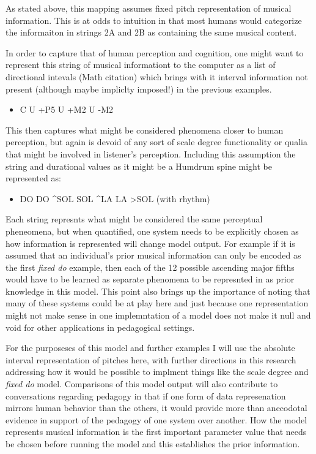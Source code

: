 \documentclass[]{book}
\providecommand{\tightlist}{%
  \setlength{\itemsep}{0pt}\setlength{\parskip}{0pt}}
\theoremstyle{definition}
\theoremstyle{definition}
\theoremstyle{definition}
\theoremstyle{remark}
\begin{document}
As stated above, this mapping assumes fixed pitch representation of
musical information. This is at odds to intuition in that most humans
would categorize the informaiton in strings 2A and 2B as containing the
same musical content.

In order to capture that of human perception and cognition, one might
want to represent this string of musical informationt to the computer as
a list of directional intevals (Math citation) which brings with it
interval information not present (although maybe impliclty imposed!) in
the previous examples.

\begin{itemize}
\tightlist
\item
  C U +P5 U +M2 U -M2
\end{itemize}

This then captures what might be considered phenomena closer to human
perception, but again is devoid of any sort of scale degree
functionality or qualia that might be involved in listener's perception.
Including this assumption the string and durational values as it might
be a Humdrum spine might be represented as:

\begin{itemize}
\tightlist
\item
  DO DO \^{}SOL SOL \^{}LA LA \textgreater{}SOL (with rhythm)
\end{itemize}

Each string represnts what might be considered the same perceptual
pheneomena, but when quantified, one system needs to be explicitly
chosen as how information is represented will change model output. For
example if it is assumed that an individual's prior musical information
can only be encoded as the first \emph{fixed do} example, then each of
the 12 possible ascending major fifths would have to be learned as
separate phenomena to be represnted in as prior knowledge in this model.
This point also brings up the importance of noting that many of these
systems could be at play here and just because one representation might
not make sense in one implemntation of a model does not make it null and
void for other applications in pedagogical settings.

For the purposeses of this model and further examples I will use the
absolute interval representation of pitches here, with further
directions in this research addressing how it would be possible to
implment things like the scale degree and \emph{fixed do} model.
Comparisons of this model output will also contribute to conversations
regarding pedagogy in that if one form of data represenation mirrors
human behavior than the others, it would provide more than anecodotal
evidence in support of the pedagogy of one system over another. How the
model represents musical information is the first important parameter
value that needs be chosen before running the model and this establishes
the prior information.
\end{document}
